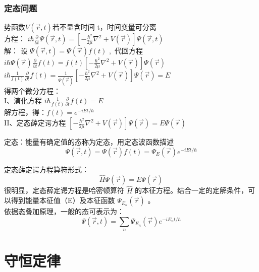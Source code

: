 \begin{frame} [allowframebreaks=]
    \frametitle{定态问题}
    势函数$V(\vec{r},t ) $若不显含时间 t，时间变量可分离 \\ \vspace{0.3cm}
    方程： { $ \displaystyle i \hbar \frac{\partial }{\partial t} \Psi (\vec{r},t ) =\left [- \frac{\hbar^2}{2\mu }\nabla ^2 + V(\vec{r}) \right ]\Psi (\vec{r},t ) $}  \\  \vspace{0.3cm}
    \alert{解：}  设  $\Psi (\vec{r},t )  = \Psi (\vec{r} ) f(t) $ , 代回方程 \\ 
     { $ \displaystyle i\hbar \Psi (\vec{r})  \frac{\partial }{\partial t} f(t)=f(t) \left [ -\frac{\hbar^2}{2\mu }\nabla ^2 + V(\vec{r}) \right ]\Psi (\vec{r}) $}  \\ 	
     { $ \displaystyle i\hbar \frac{1}{f(t)}  \frac{\partial }{\partial t} f(t)= \frac{1}{\Psi (\vec{r}) } \left [ -\frac{\hbar^2}{2\mu }\nabla ^2 + V(\vec{r}) \right ]\Psi (\vec{r}) =E $}  \\ 
     得两个微分方程：\\  \vspace{0.3cm}
     I、演化方程  $ \displaystyle  i\hbar \frac{1}{f(t)}  \frac{\partial }{\partial t} f(t)=E $  \\ 
        解方程，得：$\displaystyle  f(t) =e^{-iEt/\hbar}$ \\  \vspace{0.3cm}
    II、定态薛定谔方程 $\displaystyle   \left [ -\frac{\hbar^2}{2\mu }\nabla ^2 + V(\vec{r}) \right ]\Psi (\vec{r}) =E \Psi (\vec{r})  $   \\ 
    \begin{definition}
        定态：能量有确定值的态称为定态，用定态波函数描述
        $$ \Psi (\vec{r},t )  = \Psi (\vec{r} ) f(t) = \Psi_E (\vec{r} ) e^{-iEt/\hbar} $$ 
    \end{definition}
    定态薛定谔方程算符形式：$$\displaystyle   \hat{H} \Psi (\vec{r}) =E \Psi (\vec{r})  $$   
    很明显，定态薛定谔方程是哈密顿算符 $\hat{H}$ 的本征方程。结合一定的定解条件，可以得到能量本征值（E）及本征函数 $\Psi_{E_n} (\vec{r} )$ 。\\
    依据态叠加原理，一般的态可表示为：
    $$ \Psi (\vec{r},t ) =\sum\limits_n \Psi_{E_n} (\vec{r} ) e^{-iE_n t/\hbar}  $$
\end{frame}

\section{守恒定律}

